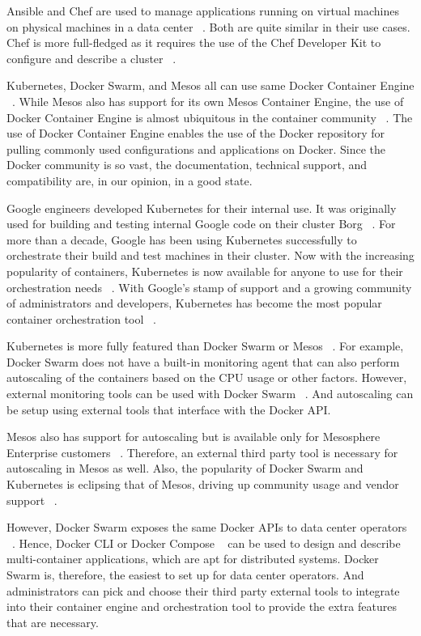 \documentclass[10pt,twocolumn]{article}
\begin{document}
Ansible and Chef are used to manage applications running on virtual machines on physical machines in a data center ~\cite{ansible, chef}.
Both are quite similar in their use cases.
Chef is more full-fledged as it requires the use of the Chef Developer Kit to configure and describe a cluster ~\cite{chef}.

Kubernetes, Docker Swarm, and Mesos all can use same Docker Container Engine ~\cite{kubernetes, docker_swarm, mesos}.
While Mesos also has support for its own Mesos Container Engine, the use of Docker Container Engine is almost ubiquitous in the container community ~\cite{intro_docker}.
The use of Docker Container Engine enables the use of the Docker repository for pulling commonly used configurations and applications on Docker.
Since the Docker community is so vast, the documentation, technical support, and compatibility are, in our opinion, in a good state.

Google engineers developed Kubernetes for their internal use.
It was originally used for building and testing internal Google code on their cluster Borg ~\cite{kubernetes, borg}.
For more than a decade, Google has been using Kubernetes successfully to orchestrate their build and test machines in their cluster.
Now with the increasing popularity of containers, Kubernetes is now available for anyone to use for their orchestration needs ~\cite{kubernetes_github}.
With Google's stamp of support and a growing community of administrators and developers, Kubernetes has become the most popular container orchestration tool ~\cite{openhub}.

Kubernetes is more fully featured than Docker Swarm or Mesos ~\cite{kubernetes}.
For example, Docker Swarm does not have a built-in monitoring agent that can also perform autoscaling of the containers based on the CPU usage or other factors.
However, external monitoring tools can be used with Docker Swarm ~\cite{docker_swarm}.
And autoscaling can be setup using external tools that interface with the Docker API.

Mesos also has support for autoscaling but is available only for Mesosphere Enterprise customers ~\cite{mesosphere}.
Therefore, an external third party tool is necessary for autoscaling in Mesos as well.
Also, the popularity of Docker Swarm and Kubernetes is eclipsing that of Mesos, driving up community usage and vendor support ~\cite{openhub}.

However, Docker Swarm exposes the same Docker APIs to data center operators ~\cite{docker_swarm}.
Hence, Docker CLI or Docker Compose ~\cite{docker_compose} can be used to design and describe multi-container applications, which are apt for distributed systems.
Docker Swarm is, therefore, the easiest to set up for data center operators.
And administrators can pick and choose their third party external tools to integrate into their container engine and orchestration tool to provide the extra features that are necessary.
\end{document}
